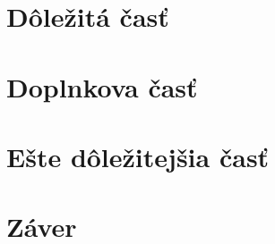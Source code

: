 \documentclass[10pt,twoside,slovak,a4paper]{article}
\begin{document}
\section{Dôležitá časť} \label{dolezita}
\section{Doplnkova časť} \label{dolezita}





\section{Ešte dôležitejšia časť} \label{dolezitejsia}




\section{Záver} \label{zaver} %






\end{document}
